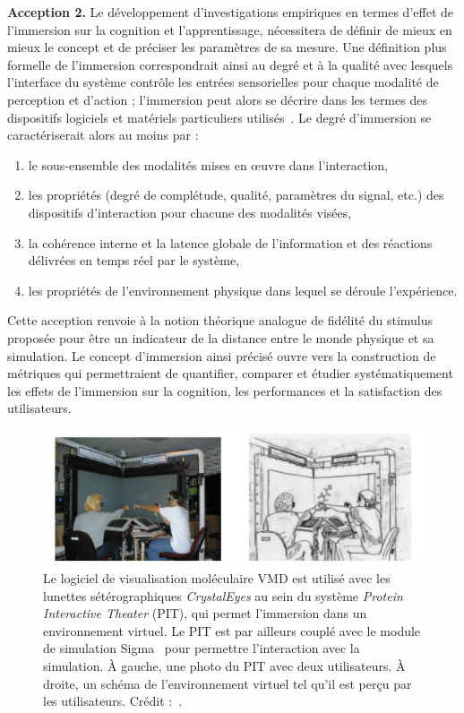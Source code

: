 \begin{displayquote}
	    \textbf{Acception 2.} Le développement d'investigations empiriques en termes d'effet de l'immersion sur la cognition et l'apprentissage, nécessitera de définir de mieux en mieux le concept et de préciser les paramètres de sa mesure. Une définition plus formelle de l'immersion correspondrait ainsi au degré et à la qualité avec lesquels l'interface du système contrôle les entrées sensorielles pour chaque modalité de perception et d'action ; l'immersion peut alors se décrire dans les termes des dispositifs logiciels et matériels particuliers utilisés~\cite{burkhardt1999conception}. Le degré d'immersion se caractériserait alors au moins par :
	    \begin{enumerate}
	        \item le sous-ensemble des modalités mises en \oe{}uvre dans l'interaction,
	        \item les propriétés (degré de complétude, qualité, paramètres du signal, etc.) des dispositifs d'interaction pour chacune des modalités visées,
	        \item la cohérence interne et la latence globale de l'information et des réactions délivrées en temps réel par le système,
	        \item les propriétés de l'environnement physique dans lequel se déroule l'expérience.
	    \end{enumerate}
	    
	    Cette acception renvoie à la notion théorique analogue de \og fidélité du stimulus \fg{}~\cite{stoffregen2003nature} proposée pour être un indicateur de la distance entre le monde physique et sa simulation. Le concept d'immersion ainsi précisé ouvre vers la construction de métriques qui permettraient de quantifier, comparer et étudier systématiquement les effets de l'immersion sur la cognition, les performances et la satisfaction des utilisateurs.
	\end{displayquote}
	
	\begin{figure}[H]
		\centering
		\includegraphics[width=\textwidth]{figures/ch1/steeredPIT}
		\caption[Dynamique moléculaire interactive en environnement virtuel.]{Le logiciel de visualisation moléculaire VMD est utilisé avec les lunettes sétérographiques \emph{CrystalEyes} au sein du système \emph{Protein Interactive Theater} (PIT), qui permet l'immersion dans un environnement virtuel. Le PIT est par ailleurs couplé avec le module de simulation Sigma~\cite{mann2002sigma} pour permettre l'interaction avec la simulation. À gauche, une photo du PIT avec deux utilisateurs. À droite, un schéma de l'environnement virtuel tel qu'il est perçu par les utilisateurs. Crédit :~\cite{prins1999virtual}.}
		\label{fig:steeredPIT}
	\end{figure}
	
